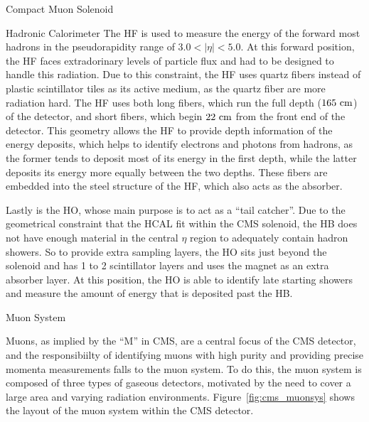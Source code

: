 \begin{section}{Compact Muon Solenoid}
\begin{subsection}{Hadronic Calorimeter}
The HF is used to measure the energy of the forward most hadrons in the pseudorapidity range of $3.0 < |\eta| < 5.0$.
At this forward position, the HF faces extradorinary levels of particle flux and had to be designed to handle this radiation.
Due to this constraint, the HF uses quartz fibers instead of plastic scintillator tiles as its active medium, as the quartz fiber are more radiation hard.
The HF uses both long fibers, which run the full depth ($165~\mathrm{cm}$) of the detector, and short fibers, which begin $22~\mathrm{cm}$ from the front end of the detector.
This geometry allows the HF to provide depth information of the energy deposits, which helps to identify electrons and photons from hadrons, as the former tends to deposit most of its energy in the first depth, while the latter deposits its energy more equally between the two depths.
These fibers are embedded into the steel structure of the HF, which also acts as the absorber.

Lastly is the HO, whose main purpose is to act as a ``tail catcher''. 
Due to the geometrical constraint that the HCAL fit within the CMS solenoid, the HB does not have enough material in the central $\eta$ region to adequately contain hadron showers.
So to provide extra sampling layers, the HO sits just beyond the solenoid and has 1 to 2 scintillator layers and uses the magnet as an extra absorber layer. 
At this position, the HO is able to identify late starting showers and measure the amount of energy that is deposited past the HB.

\end{subsection}

\begin{subsection}{Muon System}

Muons, as implied by the ``M'' in CMS, are a central focus of the CMS detector, and the responsibiilty of identifying muons with high purity and providing precise momenta measurements falls to the muon system.
To do this, the muon system is composed of three types of gaseous detectors, motivated by the need to cover a large area and varying radiation environments.
Figure~\ref{fig:cms_muonsys} shows the layout of the muon system within the CMS detector.


\end{subsection}
\end{section}
